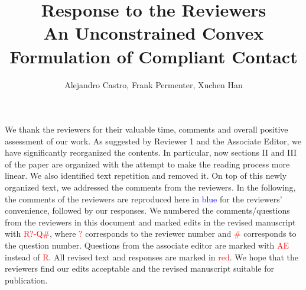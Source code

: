 \documentclass[12pt]{article}
\begin{document}
\author{Alejandro Castro, Frank Permenter, Xuchen Han}
\title{Response to the Reviewers \\
  \large An Unconstrained Convex Formulation of Compliant Contact}
\maketitle

We thank the reviewers for their valuable time, comments and overall positive
assessment of our work. As suggested by Reviewer 1 and the Associate Editor, we have
significantly reorganized the contents. In particular, now sections II
and III of the paper are organized with the attempt to make the reading process
more linear. We also identified text repetition and removed it. On top of this
newly organized text, we addressed the comments from the reviewers. In the
following, the comments of the reviewers are reproduced here in
\textcolor{blue}{blue} for the reviewers' convenience, followed by our
responses. We numbered the comments/questions from the reviewers in this
document and marked edits in the revised manuscript with
\textcolor{red}{R?-Q\#}, where \textcolor{red}{?} corresponds to the reviewer
number and \textcolor{red}{\#} corresponds to the question number. Questions
from the associate editor are marked with \textcolor{red}{AE} instead of
\textcolor{red}{R}. All revised text and responses are marked in
\textcolor{red}{red}. We hope that the reviewers find our edits acceptable and
the revised manuscript suitable for publication.








\end{document}

